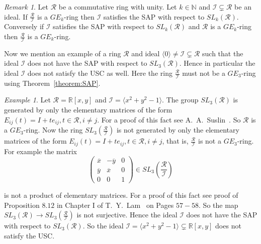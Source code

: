 \documentclass[12pt]{amsart}
\newcommand{\sbnq}{\subsetneq}
\newcommand{\mbb}{\mathbb}
\newcommand{\mcl}{\mathcal}
\newcommand{\ol}{\overline}
\newcommand{\lra}{\longrightarrow}
\newcommand{\I}{\mcl I}
\newcommand{\N}{\mbb N}
\newcommand{\R}{\mcl R}
\newcommand{\equ}[1]{%
\begin{equation*}
#1
\end{equation*}
}
\newcommand{\matthree}[9]{%
\begin{pmatrix}
  #1 & #2 & #3\\ #4 & #5 & #6\\ #7 & #8 & #9
\end{pmatrix}
}
\theoremstyle{plain}
\theoremstyle{definition}
\theoremstyle{remark}
\newtheorem{remark}[theorem]{Remark}
\newtheorem{example}[theorem]{Example}
\numberwithin{equation}{section}
\begin{document}
\begin{remark}
Let $\R$ be a commutative ring with unity. Let $k\in \N$ and $\I\sbnq \R$ be an ideal.	
If $\frac{\R}{\I}$ is a $GE_k$-ring then $\I$ satisfies the SAP with respect to $SL_k(\R)$. Conversely if $\I$ satisfies the SAP with respect to $SL_k(\R)$ and $\R$ is a $GE_k$-ring then $\frac{\R}{\I}$ is a $GE_k$-ring.
\end{remark}
Now we mention an example of a ring $\R$ and ideal $\langle 0\rangle\neq  \I\sbnq \R$ such that the ideal $\I$ does not have the SAP with respect to $SL_3(\R)$. Hence in particular the ideal $\I$ does not satisfy the USC as well. Here the ring $\frac{\R}{\I}$ must not be a $GE_3$-ring using Theorem~\ref{theorem:SAP}. 
\begin{example}
\label{Example:NotSAP}
Let $\R=\mbb{R}[x,y]$ and $\I=\langle x^2+y^2-1\rangle$. The group $SL_3(\R)$ is generated by only the elementary matrices of the form $E_{ij}(t)=I+te_{ij},t\in \R,i\neq j$.	For a proof of this fact see A.~A.~Suslin~\cite{MR0472792}. So $\R$ is a $GE_3$-ring. Now the ring $SL_3(\frac{\R}{\I})$ is not generated by only the elementary matrices of the form $E_{ij}(t)=I+te_{ij},t\in \R,i\neq j$, that is, $\frac{\R}{\I}$ is not a $GE_3$-ring.
For example the matrix \equ{\matthree {\ol{x}}{-\ol{y}}0{\ol{y}}{\ol{x}}0001\in SL_3(\frac{\R}{\I})}
is not a product of elementary matrices. For a proof of this fact see proof of Proposition $8.12$ in Chapter I of T.~Y.~Lam~\cite{MR2235330} on Pages $57-58$. So the map $SL_3(\R)\lra SL_3(\frac{\R}{\I})$ is not surjective. Hence the ideal $\I$ does not have the SAP with respect to $SL_3(\R)$. So the ideal $\I=\langle x^2+y^2-1\rangle \sbnq \mbb{R}[x,y]$ does not satisfy the USC.
\end{example}
\end{document}
